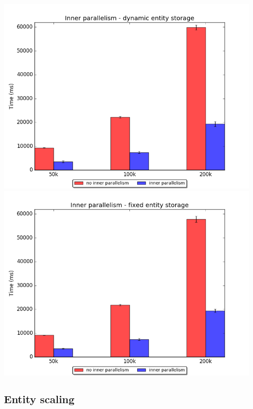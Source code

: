 \documentclass[twoside, 12pt, a4paper, openany]{book}
\begin{document}
\includegraphics{source/figures/bench/ipcomp_dynamic.png}
\includegraphics{source/figures/bench/ipcomp_fixed.png}

\subsection{Entity scaling}\label{entity-scaling}
\end{document}
